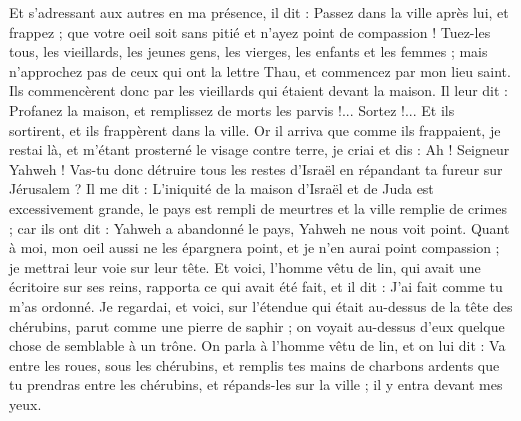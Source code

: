 \begin{multicols}{2}
Et s’adressant aux autres en ma présence, il dit : Passez dans la ville après lui, et frappez ; que votre oeil soit sans pitié et n'ayez point de compassion !
Tuez-les tous, les vieillards, les jeunes gens, les vierges, les enfants et les femmes ; mais n'approchez pas de ceux qui ont la lettre Thau, et commencez par mon lieu saint. Ils commencèrent donc par les vieillards qui étaient devant la maison.
Il leur dit : Profanez la maison, et remplissez de morts les parvis !... Sortez !... Et ils sortirent, et ils frappèrent dans la ville.
Or il arriva que comme ils frappaient, je restai là, et m'étant prosterné le visage contre terre, je criai et dis : Ah ! Seigneur Yahweh ! Vas-tu donc détruire tous les restes d'Israël en répandant ta fureur sur Jérusalem ?
Il me dit : L'iniquité de la maison d'Israël et de Juda est excessivement grande, le pays est rempli de meurtres et la ville remplie de crimes ; car ils ont dit : Yahweh a abandonné le pays, Yahweh ne nous voit point.
Quant à moi, mon oeil aussi ne les épargnera point, et je n'en aurai point compassion ; je mettrai leur voie sur leur tête.
Et voici, l'homme vêtu de lin, qui avait une écritoire sur ses reins, rapporta ce qui avait été fait, et il dit : J'ai fait comme tu m'as ordonné.
\VerseOne{}Je regardai, et voici, sur l’étendue qui était au-dessus de la tête des chérubins, parut comme une pierre de saphir ; on voyait au-dessus d’eux quelque chose de semblable à un trône.
On parla à l'homme vêtu de lin, et on lui dit : Va entre les roues, sous les chérubins, et remplis tes mains de charbons ardents que tu prendras entre  les chérubins, et répands-les sur la ville ; il y entra devant mes yeux.

\end{multicols}
